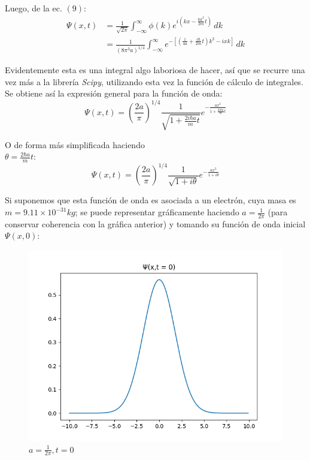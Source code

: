 Luego, de la ec. $(9)$:
\begin{align*}
    \Psi(x,t) &= \frac{1}{\sqrt{2\pi}} \int_{-\infty}^{\infty} \phi(k)e^{i(kx-\frac{\hbar k^2}{2m} t)}\,dk \\
    &= \frac{1}{(8\pi^3 a)^{1/4}} \int_{-\infty}^{\infty} e^{-\left[ \left( \frac{1}{4a}+\frac{i\hbar}{2m}t \right)k^2 - ixk\right]} \,dk
\end{align*}

Evidentemente esta es una integral algo laboriosa de hacer, así que se recurre una vez más a la librería \emph{Scipy}, 
utilizando esta vez la función de cálculo de integrales.\\
Se obtiene así la expresión general para la función de onda:
\begin{equation*}
    \Psi(x,t) = \left( \frac{2a}{\pi} \right)^{1/4} \frac{1}{\sqrt{1+\frac{2i\hbar a}{m}t}} e^{-\frac{ax^2}{1+\frac{2i\hbar a}{m}t}}
\end{equation*}

O de forma más simplificada haciendo\\ $\theta=\frac{2\hbar a}{m}t$:
\begin{equation}
    \Psi(x,t) = \left( \frac{2a}{\pi} \right)^{1/4} \frac{1}{\sqrt{1+i\theta}} e^{-\frac{ax^2}{1+i\theta}}
\end{equation}

Si suponemos que esta función de onda es asociada a un electrón, cuya masa es $m=9.11\times10^{-31} kg$; se puede 
representar gráficamente haciendo $a=\frac{1}{2\pi}$ (para conservar coherencia con la gráfica anterior) 
y tomando su función de onda inicial $\Psi(x,0)$:\\

\begin{figure}[H]
    \includegraphics[scale=0.45]{imagenes/graficas_particulalibre/psi(x,t).png}
    \caption{\emph{$a = \frac{1}{2\pi}, t = 0$}}
\end{figure}

